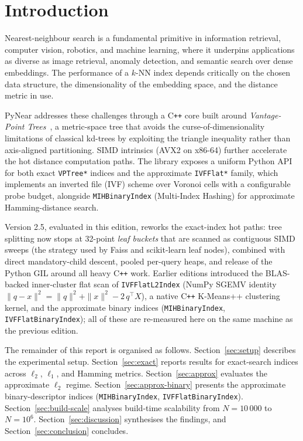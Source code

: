 \documentclass[11pt,a4paper]{article}
\begin{document}
\tableofcontents
\newpage

\section{Introduction}
\label{sec:intro}

Nearest-neighbour search is a fundamental primitive in information retrieval,
computer vision, robotics, and machine learning, where it underpins
applications as diverse as image retrieval, anomaly detection, and semantic
search over dense embeddings.  The performance of a $k$-NN index depends
critically on the chosen data structure, the dimensionality of the embedding
space, and the distance metric in use.

PyNear addresses these challenges through a C\texttt{++} core built around
\emph{Vantage-Point Trees}~\cite{yianilos1993data}, a metric-space
tree that avoids the curse-of-dimensionality limitations of classical
kd-trees by exploiting the triangle inequality rather than axis-aligned
partitioning.  SIMD intrinsics (AVX2 on x86-64) further accelerate the
hot distance computation paths.  The library exposes a uniform Python API for
both exact \texttt{VPTree*} indices and the approximate \texttt{IVFFlat*}
family, which implements an inverted file (IVF) scheme over Voronoi cells
with a configurable probe budget, alongside \texttt{MIHBinaryIndex}
(Multi-Index Hashing) for approximate Hamming-distance search.

Version 2.5, evaluated in this edition, reworks the exact-index hot paths:
tree splitting now stops at 32-point \emph{leaf buckets} that are scanned as
contiguous SIMD sweeps (the strategy used by Faiss and scikit-learn leaf
nodes), combined with direct mandatory-child descent, pooled per-query
heaps, and release of the Python GIL around all heavy C\texttt{++} work.
Earlier editions introduced the BLAS-backed inner-cluster flat scan of
\texttt{IVFFlatL2Index} (NumPy SGEMV identity
$\|q-x\|^2 = \|q\|^2 + \|x\|^2 - 2\,q^\top X$), a native C\texttt{++}
K-Means++ clustering kernel, and the approximate binary indices
(\texttt{MIHBinaryIndex}, \texttt{IVFFlatBinaryIndex}); all of these are
re-measured here on the same machine as the previous edition.

The remainder of this report is organised as follows.
Section~\ref{sec:setup} describes the experimental setup.
Section~\ref{sec:exact} reports results for exact-search indices across
$\ell_2$, $\ell_1$, and Hamming metrics.  Section~\ref{sec:approx}
evaluates the approximate $\ell_2$ regime.
Section~\ref{sec:approx-binary} presents the approximate binary-descriptor
indices (\texttt{MIHBinaryIndex}, \texttt{IVFFlatBinaryIndex}).
Section~\ref{sec:build-scale}
analyses build-time scalability from $N=10\,000$ to $N=10^6$.
Section~\ref{sec:discussion} synthesises the findings, and
Section~\ref{sec:conclusion} concludes.
\end{document}
